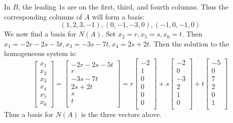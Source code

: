 \documentclass{article}
\begin{document}
\begin{example}
  In $B$, the leading $1$s are on the first, third, and fourth columns. Thus the corresponding columns of $A$ will form a basis:
  \[
    (1, 2, 3, -1), (0, -1, -3, 0), (-1, 0, -1, 0)
  \]
  We now find a basis for $N(A)$. Set $x_2 = r, x_5 = s, x_6 = t$. Then $x_1 = -2r - 2s - 5t, x_3 = -3s - 7t, x_4 = 2s + 2t$.
  Then the solution to the homogeneous system is:
  \[
    \begin{bmatrix}
      x_1\\x_2\\x_3\\x_4\\x_5\\x_6
    \end{bmatrix} =
    \begin{bmatrix}
      -2r - 2s - 5t\\
      r\\
      -3s - 7t\\
      2s + 2t\\
      s\\
      t\\
    \end{bmatrix} = r
    \begin{bmatrix}
      -2\\
      1\\
      0\\0\\0\\0\\
    \end{bmatrix} + s
    \begin{bmatrix}
      -2\\0\\-3\\2\\1\\0\\
    \end{bmatrix} + t
    \begin{bmatrix}
      -5\\0\\7\\2\\0\\1\\
    \end{bmatrix}
  \] Thus a basis for $N(A)$ is the three vectors above.
\end{example}
\end{document}
